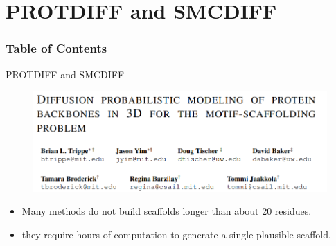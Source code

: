 \documentclass[notheorems, aspectratio=54]{beamer}
\begin{document}
\section{PROTDIFF and SMCDIFF}
\begin{frame}
    \frametitle{Table of Contents}
    \tableofcontents[currentsection]
\end{frame}

\begin{frame}{PROTDIFF and SMCDIFF}
  \vspace{-3mm}
  \begin{figure}[!h]
      \centering
      \includegraphics[width=0.9\linewidth]{figures/ProtDIFF.png}
  \end{figure}
  \begin{itemize}
    \item Many methods do not build scaffolds longer than about 20 residues.
    \item they require hours of computation to generate a single plausible scaffold.
  \end{itemize}
\end{frame}
\end{document}
